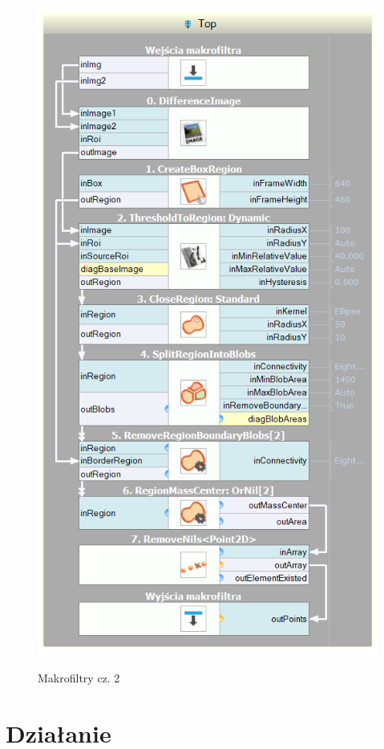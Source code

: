 \documentclass[11pt, a4paper]{article}
\begin{document}
\begin{figure}[p!]
{		\includegraphics[width = \www \linewidth]{pro5}%
		\label{fig:top}%
	}%
	
	\caption{Makrofiltry cz. 2}
	\label{fig:makro2}
\end{figure}

\clearpage
\newpage

\section{Działanie}
\end{document}
